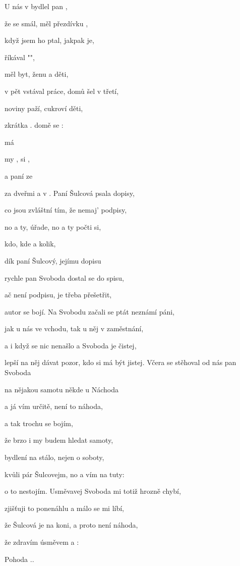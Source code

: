 

\zs
U nás v  bydlel pan , 

že se  smál, měl přezdívku , 

když jsem  ho ptal, jakpak  je, 

říkával "", 

měl  byt, ženu a  děti, 

v pět vstával  práce, domů šel v  třetí, 

noviny  paží, cukroví  děti, 

zkrátka . 
\ks
\zr
{} domě se : 

 má   

 my ,  si ,

a  paní  ze  

  za dveřmi a  v . 
\kr
\zs
Paní Šulcová psala dopisy, 

co jsou zvláštní tím, že nemaj' podpisy, 

no a ty, úřade, no a ty počti si, 

kdo, kde a kolik, 

dík paní Šulcový, jejímu dopisu 

rychle pan Svoboda dostal se do spisu, 

ač není podpisu, je třeba přešetřit, 

autor se bojí. 
\ks
\zr
Na Svobodu začali se ptát neznámí páni, 

jak u nás ve vchodu, tak u něj v zaměstnání, 

a i když se nic nenašlo a Svoboda je čistej, 

lepší na něj dávat pozor, kdo si má být jistej. 
\kr
\zs
Včera se stěhoval od nás pan Svoboda 

na nějakou samotu někde u Náchoda 

a já vím určitě, není to náhoda, 

a tak trochu se bojím, 

že brzo i my budem hledat samoty, 

bydlení na stálo, nejen o soboty, 

kvůli pár Šulcovejm, no a vím na tuty: 

o to nestojím. 
\ks
\zr
Usměvavej Svoboda mi totiž hrozně chybí, 

zjišťuji to ponenáhlu a málo se mi líbí, 

že Šulcová je na koni, a proto není náhoda, 

že  zdravím úsměvem a : 

Pohoda ..
\kr
\kp

